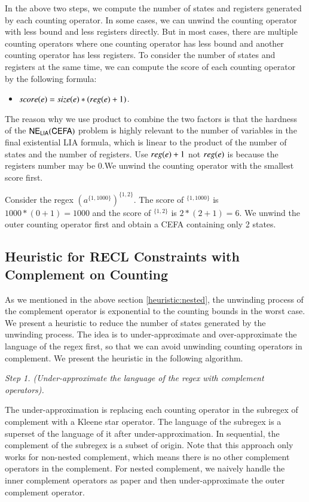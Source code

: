 In the above two steps, we compute the number of states and registers generated by each counting operator. In some cases, we can unwind the counting operator with less bound and less registers directly. But in most cases, there are multiple counting operators where one counting operator has less bound and another counting operator has less registers. To consider the number of states and registers at the same time, we can compute the score of each counting operator by the following formula:
\begin{itemize}
  \item $score(e) = size(e) * (reg(e)+1)$.
\end{itemize} 
The reason why we use product to combine the two factors is that the hardness of the ${\sf NE_{LIA}(CEFA)}$ problem is highly relevant to the number of variables in the final existential LIA formula, which is linear to the product of the number of states and the number of registers. Use $reg(e) + 1$ not $reg(e)$ is because the registers number may be $0$.We unwind the counting operator with the smallest score first. 

\begin{example}
  Consider the regex $(a^{\{1,1000\}})^{\{1,2\}}$. The score of $^{\{1,1000\}}$ is $1000*(0+1) = 1000$ and the score of $^{\{1,2\}}$ is $2*(2+1) = 6$. We unwind the outer counting operator first and obtain a CEFA containing only 2 states.  
\end{example}

\subsection{Heuristic for RECL Constraints with Complement on Counting}
As we mentioned in the above section \ref{heuristic:nested}, the unwinding process of the complement operator is exponential to the counting bounds in the worst case. We present a heuristic to reduce the number of states generated by the unwinding process. The idea is to under-approximate and over-approximate the language of the regex first, so that we can avoid unwinding counting operators in complement. We present the heuristic in the following algorithm.

\medskip
\noindent
\emph{Step 1. (Under-approximate the language of the regex with complement operators).}

The under-approximation is replacing each counting operator in the subregex of complement with a Kleene star operator. The language of the subregex is a superset of the language of it after under-approximation. In sequential, the complement of the subregex is a subset of origin. Note that this approach only works for non-nested complement, which means there is no other complement operators in the complement. For nested complement,  we naively handle the inner complement operators as paper \cite{Denghang2023} and then under-approximate the outer complement operator.

